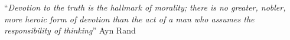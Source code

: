 \documentclass[
openright,
12pt, %
english,%
onehalfspacing, %
nolistspacing, %
nohyperref, %
headsepline, %
]{MastersDoctoralThesis} %
\begin{document}

%    
%    
%    



\vspace*{0.2\textheight}

\noindent\enquote{\itshape Devotion to the truth is the hallmark of morality; there is no greater, nobler, more heroic form of devotion than the act of a man who assumes the responsibility of thinking}\bigbreak
\hfill Ayn Rand
\end{document}

